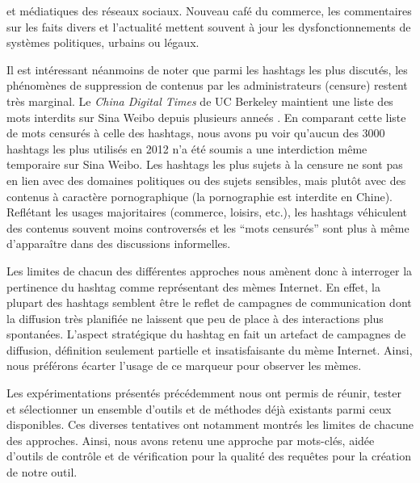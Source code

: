 et médiatiques des réseaux sociaux. Nouveau café du commerce, les commentaires sur les faits divers et l{\textquoteright}actualité mettent souvent à jour les dysfonctionnements de systèmes politiques, urbains ou légaux. 

Il est intéressant néanmoins de noter que parmi les hashtags les plus discutés, les phénomènes de suppression de contenus par les administrateurs (censure) restent très marginal. Le \textit{China Digital Times} de UC Berkeley maintient une liste des mots interdits sur Sina Weibo depuis plusieurs anneés \citep{Ng2013}. En comparant cette liste de mots censurés à celle des hashtags, nous avons pu voir qu{\textquoteright}aucun des 3000 hashtags les plus utilisés en 2012 n{\textquoteright}a été soumis a une interdiction m\^eme temporaire sur Sina Weibo. Les hashtags les plus sujets à la censure ne sont pas en lien avec des domaines politiques ou des sujets sensibles, mais plut\^ot avec des contenus à caractère pornographique (la pornographie est interdite en Chine). Reflétant les usages majoritaires (commerce, loisirs, etc.), les hashtags véhiculent des contenus souvent moins controversés et les {\textquotedblleft}mots censurés{\textquotedblright} sont plus à m\^eme d{\textquoteright}appara\^itre dans des discussions informelles.

Les limites de chacun des différentes approches nous amènent donc à interroger la pertinence du hashtag comme représentant des mèmes Internet. En effet, la plupart des hashtags semblent être le reflet de campagnes de communication dont la diffusion très planifiée ne laissent que peu de place à des interactions plus spontanées. L'aspect stratégique du hashtag en fait un artefact de campagnes de diffusion, définition seulement partielle et insatisfaisante du mème Internet.  Ainsi, nous préférons écarter l'usage de ce marqueur pour observer les mèmes.

\bigskip

Les expérimentations présentés précédemment nous ont permis de réunir, tester et sélectionner un ensemble d'outils et de méthodes déjà existants parmi ceux disponibles. Ces diverses tentatives ont notamment montrés les limites de chacune des approches. Ainsi, nous avons retenu une approche par mots-clés, aidée d'outils de contrôle et de vérification pour la qualité des requêtes pour la création de notre outil.